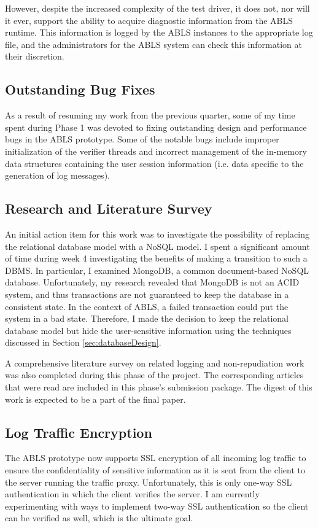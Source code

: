 \documentclass{sig-alternate}
\begin{document}
However, despite the increased complexity of the test driver, it does not, nor will it ever, support the ability to acquire 
diagnostic information from the ABLS runtime. This information is logged by the ABLS instances to the appropriate log 
file, and the administrators for the ABLS system can check this information at their discretion.

\subsection{Outstanding Bug Fixes}
As a result of resuming my work from the previous quarter, some of my time spent during Phase 1 was devoted to fixing
outstanding design and performance bugs in the ABLS prototype. Some of the notable bugs include improper 
initialization of the verifier threads and incorrect management of the in-memory data structures containing the 
user session information (i.e. data specific to the generation of log messages).

\subsection{Research and Literature Survey}
An initial action item for this work was to investigate the possibility of replacing the relational database model with a 
NoSQL model. I spent a significant amount of time during week 4 investigating the benefits of making a transition
to such a DBMS. In particular, I examined MongoDB, a common document-based NoSQL database. Unfortunately,
my research revealed that MongoDB is not an ACID system, and thus transactions are not guaranteed to keep the
database in a consistent state. In the context of ABLS, a failed transaction could put the system in a bad state. Therefore,
I made the decision to keep the relational database model but hide the user-sensitive information using the techniques
discussed in Section \ref{sec:databaseDesign}.

A comprehensive literature survey on related logging and non-repudiation work was also completed during this phase 
of the project. The corresponding articles that were read are included in this phase's submission package. The digest 
of this work is expected to be a part of the final paper.

\subsection{Log Traffic Encryption}
The ABLS prototype now supports SSL encryption of all incoming log traffic to ensure the confidentiality of sensitive
information as it is sent from the client to the server running the traffic proxy. Unfortunately, this is only one-way SSL 
authentication in which the client verifies the server. I am currently experimenting with ways to implement two-way 
SSL authentication so the client can be verified as well, which is the ultimate goal. 
\end{document}
